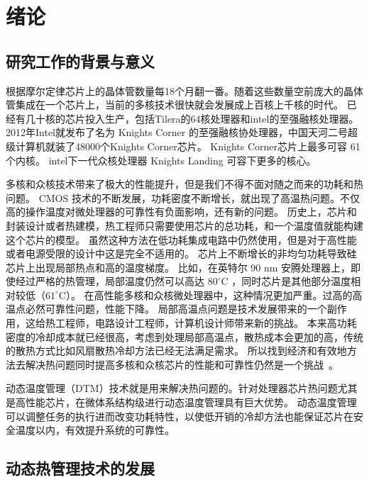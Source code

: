 
\chapter{绪论}
\section{研究工作的背景与意义}\label{sec:mean}
根据摩尔定律芯片上的晶体管数量每18个月翻一番。随着这些数量空前庞大的晶体管集成在一个芯片上，当前的多核技术很快就会发展成上百核上千核的时代\cite{borkar:DAC'07}。
已经有几十核的芯片投入生产，包括Tilera的64核处理器和intel的至强融核处理器。2012年Intel就发布了名为 Knights Corner 的至强融核协处理器，中国天河二号超级计算机就装了48000个Knights Corner芯片。
Knights Corner芯片上最多可容 61个内核。
intel下一代众核处理器 Knights Landing 可容下更多的核心。


多核和众核技术带来了极大的性能提升，但是我们不得不面对随之而来的功耗和热问题。
CMOS 技术的不断发展，功耗密度不断增长，就出现了高温热问题。不仅高的操作温度对微处理器的可靠性有负面影响，还有新的问题。
历史上，芯片和封装设计或者热建模，热工程师只需要使用芯片的总功耗，和一个温度值就能构建这个芯片的模型。
虽然这种方法在低功耗集成电路中仍然使用，但是对于高性能或者电源受限的设计中这是完全不适用的。
芯片上不断增长的非均匀功耗导致硅芯片上出现局部热点和高的温度梯度。
比如，在英特尔 90 nm 安腾处理器上，即使经过严格的热管理，局部温度仍然可以高达 $80 ^\circ$C ，同时芯片是其他部分温度相对较低（$61^\circ$C）\cite{mcgowen2006power}。
在高性能多核和众核微处理器中，这种情况更加严重。过高的高温点必然可靠性问题，性能下降。
局部高温点问题是技术发展带来的一个副作用，这给热工程师，电路设计工程师，计算机设计师带来新的挑战。
本来高功耗密度的冷却成本就已经很高，考虑到处理局部高温点，散热成本会更加的高，传统的散热方式比如风扇散热冷却方法已经无法满足需求。
所以找到经济和有效地方法去解决热问题同时提高多核和众核芯片的性能和可靠性仍然是一个挑战~\cite{Brooks:MICRO'07}。


动态温度管理（DTM）技术就是用来解决热问题的。针对处理器芯片热问题尤其是高性能芯片，在微体系结构级进行动态温度管理具有巨大优势。
动态温度管理可以调整任务的执行进而改变功耗特性，以使低开销的冷却方法也能保证芯片在安全温度以内，有效提升系统的可靠性。


\section{动态热管理技术的发展}\label{sec:his}


